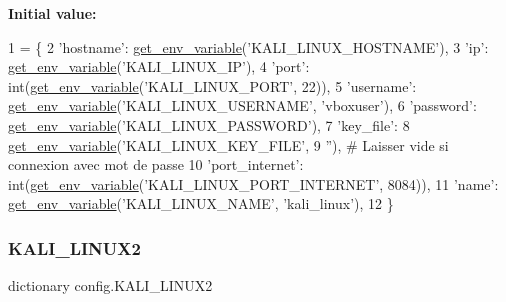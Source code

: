 {\bfseries Initial value\+:}
\begin{DoxyCode}
1 =  \{
2     \textcolor{stringliteral}{'hostname'}: \hyperlink{namespaceconfig_a7cf1bd9315cd5f3237441a2d9414082d}{get\_env\_variable}(\textcolor{stringliteral}{'KALI\_LINUX\_HOSTNAME'}),
3     \textcolor{stringliteral}{'ip'}: \hyperlink{namespaceconfig_a7cf1bd9315cd5f3237441a2d9414082d}{get\_env\_variable}(\textcolor{stringliteral}{'KALI\_LINUX\_IP'}),
4     \textcolor{stringliteral}{'port'}: int(\hyperlink{namespaceconfig_a7cf1bd9315cd5f3237441a2d9414082d}{get\_env\_variable}(\textcolor{stringliteral}{'KALI\_LINUX\_PORT'}, 22)),
5     \textcolor{stringliteral}{'username'}: \hyperlink{namespaceconfig_a7cf1bd9315cd5f3237441a2d9414082d}{get\_env\_variable}(\textcolor{stringliteral}{'KALI\_LINUX\_USERNAME'}, \textcolor{stringliteral}{'vboxuser'}),
6     \textcolor{stringliteral}{'password'}: \hyperlink{namespaceconfig_a7cf1bd9315cd5f3237441a2d9414082d}{get\_env\_variable}(\textcolor{stringliteral}{'KALI\_LINUX\_PASSWORD'}),
7     \textcolor{stringliteral}{'key\_file'}:
8     \hyperlink{namespaceconfig_a7cf1bd9315cd5f3237441a2d9414082d}{get\_env\_variable}(\textcolor{stringliteral}{'KALI\_LINUX\_KEY\_FILE'},
9                      \textcolor{stringliteral}{''}),  \textcolor{comment}{# Laisser vide si connexion avec mot de passe}
10     \textcolor{stringliteral}{'port\_internet'}: int(\hyperlink{namespaceconfig_a7cf1bd9315cd5f3237441a2d9414082d}{get\_env\_variable}(\textcolor{stringliteral}{'KALI\_LINUX\_PORT\_INTERNET'}, 8084)),
11     \textcolor{stringliteral}{'name'}: \hyperlink{namespaceconfig_a7cf1bd9315cd5f3237441a2d9414082d}{get\_env\_variable}(\textcolor{stringliteral}{'KALI\_LINUX\_NAME'}, \textcolor{stringliteral}{'kali\_linux'}),
12 \}
\end{DoxyCode}
\mbox{\label{namespaceconfig_a087dd3633f6caa5a0ae259f99d9d6d47}} 
\subsubsection{\texorpdfstring{K\+A\+L\+I\+\_\+\+L\+I\+N\+U\+X2}{KALI\_LINUX2}}
{\footnotesize\ttfamily dictionary config.\+K\+A\+L\+I\+\_\+\+L\+I\+N\+U\+X2}

